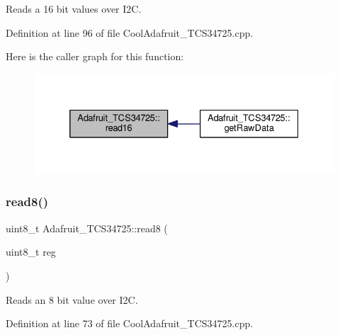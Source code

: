Reads a 16 bit values over I2C. 



Definition at line 96 of file Cool\+Adafruit\+\_\+\+T\+C\+S34725.\+cpp.

Here is the caller graph for this function\+:\nopagebreak
\begin{figure}[H]
\begin{center}
\leavevmode
\includegraphics[width=332pt]{class_adafruit___t_c_s34725_a6b9b65ff0f1e57797a1c05a43fd25385_icgraph}
\end{center}
\end{figure}
\mbox{\label{class_adafruit___t_c_s34725_a3ffafbdd475d6baf9abda8dd067b5319}} 
\subsubsection{\texorpdfstring{read8()}{read8()}}
{\footnotesize\ttfamily uint8\+\_\+t Adafruit\+\_\+\+T\+C\+S34725\+::read8 (\begin{DoxyParamCaption}\item[{uint8\+\_\+t}]{reg }\end{DoxyParamCaption})}



Reads an 8 bit value over I2C. 



Definition at line 73 of file Cool\+Adafruit\+\_\+\+T\+C\+S34725.\+cpp.


